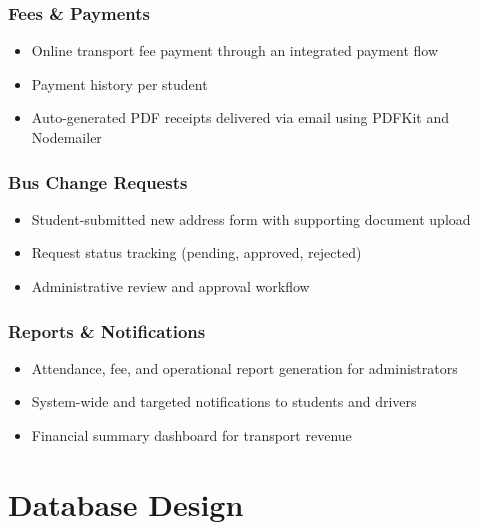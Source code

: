 \documentclass[11pt,a4paper]{report}
\begin{document}
\subsection{Fees \& Payments}
\begin{itemize}[leftmargin=1.3em]
  \item Online transport fee payment through an integrated payment flow
  \item Payment history per student
  \item Auto-generated PDF receipts delivered via email using PDFKit and Nodemailer
\end{itemize}

\subsection{Bus Change Requests}
\begin{itemize}[leftmargin=1.3em]
  \item Student-submitted new address form with supporting document upload
  \item Request status tracking (pending, approved, rejected)
  \item Administrative review and approval workflow
\end{itemize}

\subsection{Reports \& Notifications}
\begin{itemize}[leftmargin=1.3em]
  \item Attendance, fee, and operational report generation for administrators
  \item System-wide and targeted notifications to students and drivers
  \item Financial summary dashboard for transport revenue
\end{itemize}

\chapter{Database Design}
\end{document}
